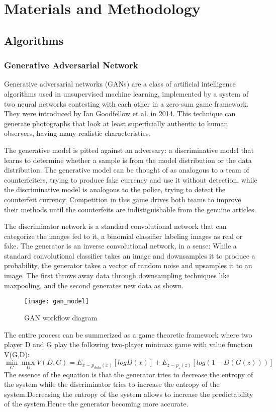 \chapter{Materials and Methodology}
\section{Algorithms}
\subsection{Generative Adversarial Network}
Generative adversarial networks (GANs) are a class of artificial intelligence algorithms used in unsupervised machine learning, implemented by a system of two neural networks contesting with each other in a zero-sum game framework. They were introduced by Ian Goodfellow et al. in 2014. This technique can generate photographs that look at least superficially authentic to human observers, having many realistic characteristics.

The generative model is pitted against an adversary: a
discriminative model that learns to determine whether a sample is from the model distribution or the
data distribution. The generative model can be thought of as analogous to a team of counterfeiters,
trying to produce fake currency and use it without detection, while the discriminative model is
analogous to the police, trying to detect the counterfeit currency. Competition in this game drives
both teams to improve their methods until the counterfeits are indistiguishable from the genuine
articles.

The discriminator network is a standard convolutional network that can categorize the images fed to it, a binomial classifier labeling images as real or fake. The generator is an inverse convolutional network, in a sense: While a standard convolutional classifier takes an image and downsamples it to produce a probability, the generator takes a vector of random noise and upsamples it to an image. The first throws away data through downsampling techniques like maxpooling, and the second generates new data as shown.


\begin{figure}
 \centering
 \texttt{[image: gan\_model]}
 \caption{GAN workflow diagram}
 \label{fig:ganmodel}
\end{figure}

The entire process can be summerized as a game theoretic framework where two player D and G play the following two-player minimax game with value function V(G,D):
\begin{equation}
\min_{G}\max_{D}V(D,G) = E_{x\sim p_{data}(x)}[log D(x)] + E_{z\sim p_z(z)}[log( 1 - D(G(z)))] 
\end{equation}
The essence of the equation is that the generator tries to decrease the entropy of the system while the discriminator  tries to increase the entropy of the system.Decreasing the entropy of the system allows to increase the predictability of the system.Hence the generator becoming more accurate.

